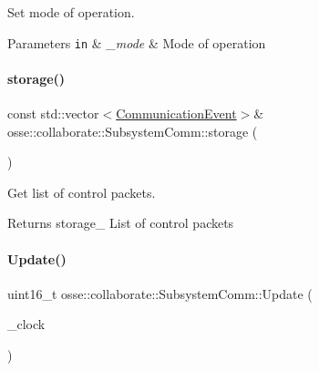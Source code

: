 Set mode of operation. 


\begin{DoxyParams}[1]{Parameters}
\mbox{\tt in}  & {\em \+\_\+mode} & Mode of operation \\
\hline
\end{DoxyParams}
\mbox{\label{classosse_1_1collaborate_1_1_subsystem_comm_a9c9e0f1c881dd90275186b5146236849}} 
\paragraph{\texorpdfstring{storage()}{storage()}}
{\footnotesize\ttfamily const std\+::vector$<$\hyperlink{structosse_1_1collaborate_1_1_subsystem_comm_1_1_communication_event}{Communication\+Event}$>$\& osse\+::collaborate\+::\+Subsystem\+Comm\+::storage (\begin{DoxyParamCaption}{ }\end{DoxyParamCaption})\hspace{0.3cm}{\ttfamily [inline]}}



Get list of control packets. 

\begin{DoxyReturn}{Returns}
storage\+\_\+ List of control packets 
\end{DoxyReturn}
\mbox{\label{classosse_1_1collaborate_1_1_subsystem_comm_ab3675c014fa2575e699a43f870c1d4f0}} 
\paragraph{\texorpdfstring{Update()}{Update()}}
{\footnotesize\ttfamily uint16\+\_\+t osse\+::collaborate\+::\+Subsystem\+Comm\+::\+Update (\begin{DoxyParamCaption}\item[{const \hyperlink{classosse_1_1collaborate_1_1_simulation_clock}{Simulation\+Clock} \&}]{\+\_\+clock }\end{DoxyParamCaption})}



